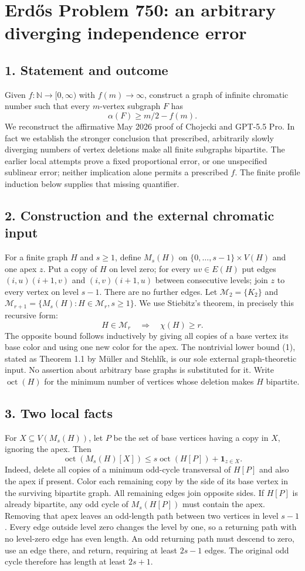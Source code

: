 \section*{Erd\H{o}s Problem 750: an arbitrary diverging independence error}
\subsection*{1. Statement and outcome}
Given $f:\mathbb N\to[0,\infty)$ with $f(m)\to\infty$, construct a graph of infinite chromatic number such that every $m$-vertex subgraph $F$ has
\[
 \alpha(F)\ge m/2-f(m).
\]
We reconstruct the affirmative May 2026 proof of Chojecki and GPT-5.5 Pro. In fact we establish the stronger conclusion that prescribed, arbitrarily slowly diverging numbers of vertex deletions make all finite subgraphs bipartite. The earlier local attempts prove a fixed proportional error, or one unspecified sublinear error; neither implication alone permits a prescribed $f$. The finite profile induction below supplies that missing quantifier.
\subsection*{2. Construction and the external chromatic input}
For a finite graph $H$ and $s\ge1$, define $M_s(H)$ on $\{0,\ldots,s-1\}\times V(H)$ and one apex $z$. Put a copy of $H$ on level zero; for every $uv\in E(H)$ put edges $(i,u)(i+1,v)$ and $(i,v)(i+1,u)$ between consecutive levels; join $z$ to every vertex on level $s-1$. There are no further edges.
Let $\mathcal M_2=\{K_2\}$ and $\mathcal M_{r+1}=\{M_s(H):H\in\mathcal M_r, s\ge1\}$. We use Stiebitz's theorem, in precisely this recursive form:
\[
 H\in\mathcal M_r\quad\Longrightarrow\quad\chi(H)\ge r. \tag{1}
\]
The opposite bound follows inductively by giving all copies of a base vertex its base color and using one new color for the apex. The nontrivial lower bound (1), stated as Theorem 1.1 by M\"uller and Stehl\'ik, is our sole external graph-theoretic input. No assertion about arbitrary base graphs is substituted for it.
Write $\operatorname{oct}(H)$ for the minimum number of vertices whose deletion makes $H$ bipartite.
\subsection*{3. Two local facts}
For $X\subseteq V(M_s(H))$, let $P$ be the set of base vertices having a copy in $X$, ignoring the apex. Then
\[
 \operatorname{oct}(M_s(H)[X])\le s\operatorname{oct}(H[P])+\mathbf1_{z\in X}. \tag{2}
\]
Indeed, delete all copies of a minimum odd-cycle transversal of $H[P]$ and also the apex if present. Color each remaining copy by the side of its base vertex in the surviving bipartite graph. All remaining edges join opposite sides.
If $H[P]$ is already bipartite, any odd cycle of $M_s(H[P])$ must contain the apex. Removing that apex leaves an odd-length path between two vertices in level $s-1$. Every edge outside level zero changes the level by one, so a returning path with no level-zero edge has even length. An odd returning path must descend to zero, use an edge there, and return, requiring at least $2s-1$ edges. The original odd cycle therefore has length at least $2s+1$.
